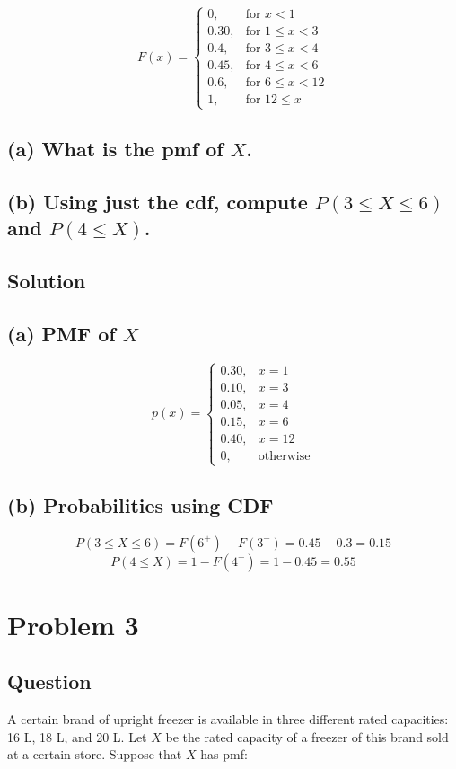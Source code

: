\documentclass{article}
\begin{document}
\[
F(x) = 
\begin{cases} 
0, & \text{for } x < 1 \\
0.30, & \text{for } 1 \leq x < 3 \\
0.4, & \text{for } 3 \leq x < 4 \\
0.45, & \text{for } 4 \leq x < 6 \\
0.6, & \text{for } 6 \leq x < 12 \\
1, & \text{for } 12 \leq x 
\end{cases}
\]

\subsection*{(a) What is the pmf of \(X\).}

\subsection*{(b) Using just the cdf, compute \(P(3 \leq X \leq 6)\) and \(P(4 \leq X)\).}

\subsection*{Solution}

\subsection*{(a) PMF of \(X\)}
\[
p(x) = 
\begin{cases} 
0.30, & x = 1 \\
0.10, & x = 3 \\
0.05, & x = 4 \\
0.15, & x = 6 \\
0.40, & x = 12 \\
0, & \text{otherwise}
\end{cases}
\]

\subsection*{(b) Probabilities using CDF}
\[
P(3 \leq X \leq 6) = F(6^+) - F(3^-) = 0.45 - 0.3 = 0.15
\]
\[
P(4 \leq X) = 1 - F(4^+) = 1 - 0.45 = 0.55
\]
\section*{Problem 3}
\subsection*{Question}A certain brand of upright freezer is available in three different rated capacities: 16 L, 18 L, and 20 L. Let \(X\) be the rated capacity of a freezer of this brand sold at a certain store. Suppose that \(X\) has pmf:
\end{document}
